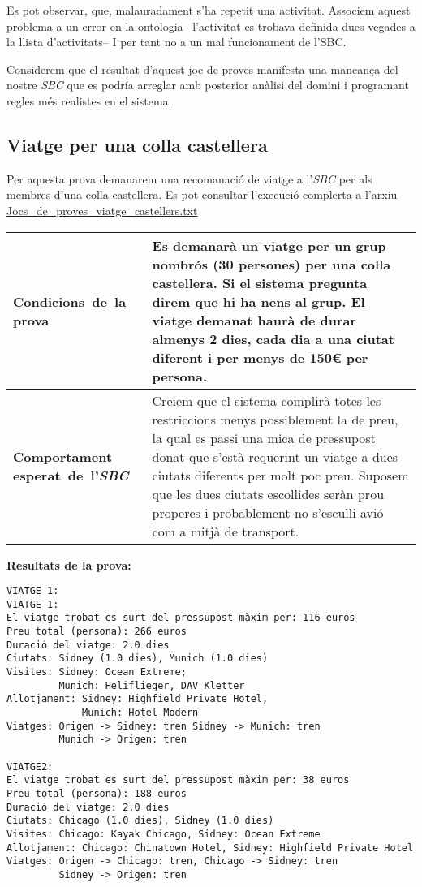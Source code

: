 \documentclass[11pt,a4paper]{article}
\begin{document}
Es pot observar, que, malauradament s'ha repetit una activitat. Associem aquest problema a un error en la ontologia --l'activitat es trobava definida dues vegades a la llista d'activitats-- I per tant no a un mal funcionament de l'SBC.

Considerem que el resultat d'aquest joc de proves manifesta una mancança del nostre \emph{SBC} que es podría arreglar amb posterior anàlisi del domini i programant regles més realistes en el sistema.

\subsection{Viatge per una colla castellera}
Per aquesta prova demanarem una recomanació de viatge a l'\emph{SBC} per als membres d'una colla castellera. Es pot consultar l'execució complerta a l'arxiu \url{Jocs_de_proves_viatge_castellers.txt} \\

\noindent
\begin{tabular}{|p{}|p{}|}
\hline
\textbf{\mbox{Condicions de la} \mbox{prova}} & Es demanarà un viatge per un grup nombrós (30 persones) per una colla castellera. Si el sistema pregunta direm que hi ha nens al grup. El viatge demanat haurà de durar almenys 2 dies, cada dia a una ciutat diferent i per menys de 150\euro{} per persona.\\
\hline
\textbf{Comportament \mbox{esperat de l'\emph{SBC}}} & Creiem que el sistema complirà totes les restriccions menys possiblement la de preu, la qual es passi una mica de pressupost donat que s'està requerint un viatge a dues ciutats diferents per molt poc preu. Suposem que les dues ciutats escollides seràn prou properes i probablement no s'esculli avió com a mitjà de transport. \\
\hline
\end{tabular} 
\bigskip

\textbf{Resultats de la prova:} 
\begin{lstlisting}VIATGE 1:
VIATGE 1:
El viatge trobat es surt del pressupost màxim per: 116 euros 
Preu total (persona): 266 euros 
Duració del viatge: 2.0 dies 
Ciutats: Sidney (1.0 dies), Munich (1.0 dies) 
Visites: Sidney: Ocean Extreme;
         Munich: Heliflieger, DAV Kletter 
Allotjament: Sidney: Highfield Private Hotel,
             Munich: Hotel Modern 
Viatges: Origen -> Sidney: tren Sidney -> Munich: tren
         Munich -> Origen: tren 

VIATGE2:
El viatge trobat es surt del pressupost màxim per: 38 euros 
Preu total (persona): 188 euros 
Duració del viatge: 2.0 dies 
Ciutats: Chicago (1.0 dies), Sidney (1.0 dies) 
Visites: Chicago: Kayak Chicago, Sidney: Ocean Extreme 
Allotjament: Chicago: Chinatown Hotel, Sidney: Highfield Private Hotel 
Viatges: Origen -> Chicago: tren, Chicago -> Sidney: tren
         Sidney -> Origen: tren
\end{lstlisting} 
\end{document}
